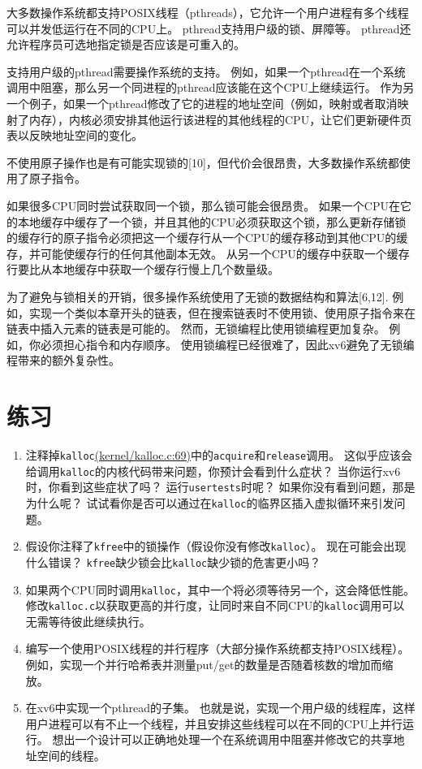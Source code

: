 大多数操作系统都支持POSIX线程（pthreads），它允许一个用户进程有多个线程可以并发低运行在不同的CPU上。
pthread支持用户级的锁、屏障等。
pthread还允许程序员可选地指定锁是否应该是可重入的。

支持用户级的pthread需要操作系统的支持。
例如，如果一个pthread在一个系统调用中阻塞，那么另一个同进程的pthread应该能在这个CPU上继续运行。
作为另一个例子，如果一个pthread修改了它的进程的地址空间（例如，映射或者取消映射了内存），内核必须安排其他运行该进程的其他线程的CPU，让它们更新硬件页表以反映地址空间的变化。

不使用原子操作也是有可能实现锁的[10]，但代价会很昂贵，大多数操作系统都使用了原子指令。

如果很多CPU同时尝试获取同一个锁，那么锁可能会很昂贵。
如果一个CPU在它的本地缓存中缓存了一个锁，并且其他的CPU必须获取这个锁，那么更新存储锁的缓存行的原子指令必须把这一个缓存行从一个CPU的缓存移动到其他CPU的缓存，并可能使缓存行的任何其他副本无效。
从另一个CPU的缓存中获取一个缓存行要比从本地缓存中获取一个缓存行慢上几个数量级。

为了避免与锁相关的开销，很多操作系统使用了无锁的数据结构和算法[6,12].
例如，实现一个类似本章开头的链表，但在搜索链表时不使用锁、使用原子指令来在链表中插入元素的链表是可能的。
然而，无锁编程比使用锁编程更加复杂。
例如，你必须担心指令和内存顺序。
使用锁编程已经很难了，因此xv6避免了无锁编程带来的额外复杂性。

\section{练习}
\begin{enumerate}
    \item 注释掉\texttt{kalloc}\href{https://github.com/mit-pdos/xv6-riscv/blob/risc/kernel/kalloc.c#L69}{(kernel/kalloc.c:69)}中的\texttt{acquire}和\texttt{release}调用。
    这似乎应该会给调用\texttt{kalloc}的内核代码带来问题，你预计会看到什么症状？
    当你运行xv6时，你看到这些症状了吗？
    运行\texttt{usertests}时呢？
    如果你没有看到问题，那是为什么呢？
    试试看你是否可以通过在\texttt{kalloc}的临界区插入虚拟循环来引发问题。
    \item 假设你注释了\texttt{kfree}中的锁操作（假设你没有修改\texttt{kalloc}）。
    现在可能会出现什么错误？
    \texttt{kfree}缺少锁会比\texttt{kalloc}缺少锁的危害更小吗？
    \item 如果两个CPU同时调用\texttt{kalloc}，其中一个将必须等待另一个，这会降低性能。
    修改\texttt{kalloc.c}以获取更高的并行度，让同时来自不同CPU的\texttt{kalloc}调用可以无需等待彼此继续执行。
    \item 编写一个使用POSIX线程的并行程序（大部分操作系统都支持POSIX线程）。
    例如，实现一个并行哈希表并测量put/get的数量是否随着核数的增加而缩放。
    \item 在xv6中实现一个pthread的子集。
    也就是说，实现一个用户级的线程库，这样用户进程可以有不止一个线程，并且安排这些线程可以在不同的CPU上并行运行。
    想出一个设计可以正确地处理一个在系统调用中阻塞并修改它的共享地址空间的线程。
\end{enumerate}
